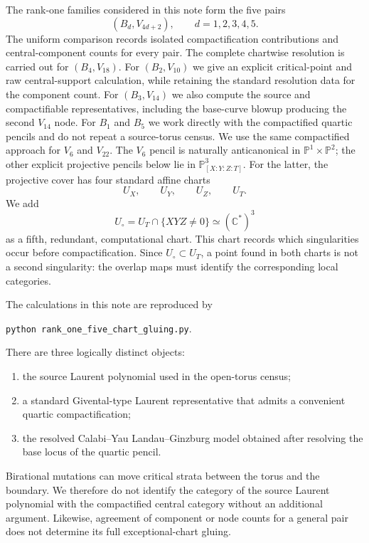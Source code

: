 \documentclass[11pt]{amsart}
\theoremstyle{definition}
\theoremstyle{remark}
\begin{document}
The rank-one families considered in this note form the five pairs
\[
(B_d,V_{4d+2}),
\qquad d=1,2,3,4,5.
\]
The uniform comparison records isolated compactification contributions and
central-component counts for every pair.  The complete chartwise resolution
is carried out for $(B_4,V_{18})$.  For $(B_2,V_{10})$ we give an explicit
critical-point and raw central-support calculation, while retaining the
standard resolution data for the component count.  For $(B_3,V_{14})$ we
also compute the source and compactifiable representatives, including the
base-curve blowup producing the second $V_{14}$ node.  For $B_1$ and $B_5$
we work directly with the compactified quartic pencils and do not repeat a
source-torus census.  We use the same compactified approach for $V_6$ and
$V_{22}$.  The $V_6$ pencil is naturally anticanonical in
$\mathbb P^1\times\mathbb P^2$; the other explicit projective pencils below
lie in $\mathbb P^3_{[X:Y:Z:T]}$.  For the latter, the projective cover has four
standard affine charts
\[
U_X,\qquad U_Y,\qquad U_Z,\qquad U_T.
\]
We add
\[
U_\circ=U_T\cap\{XYZ\neq0\}\simeq(\mathbb C^*)^3
\]
as a fifth, redundant, computational chart.  This chart records which
singularities occur before compactification.  Since $U_\circ\subset U_T$, a
point found in both charts is not a second singularity: the overlap maps must
identify the corresponding local categories.

The calculations in this note are reproduced by
\begin{center}
\texttt{python rank\_one\_five\_chart\_gluing.py}.
\end{center}

There are three logically distinct objects:
\begin{enumerate}
\item the source Laurent polynomial used in the open-torus census;
\item a standard Givental-type Laurent representative that admits a convenient
quartic compactification;
\item the resolved Calabi--Yau Landau--Ginzburg model obtained after resolving
the base locus of the quartic pencil.
\end{enumerate}
Birational mutations can move critical strata between the torus and the
boundary.  We therefore do not identify the category of the source Laurent
polynomial with the compactified central category without an additional
argument.  Likewise, agreement of component or node counts for a general
pair does not determine its full exceptional-chart gluing.
\end{document}
